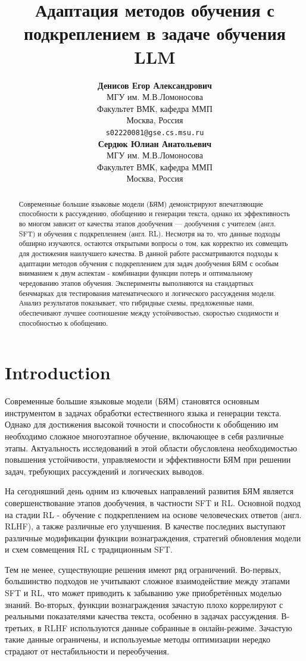 \documentclass{article}
\title{Адаптация методов обучения с подкреплением в задаче обучения LLM}
\author{\textbf{Денисов Егор Александрович} \\
	МГУ им. М.В.Ломоносова \\
	Факультет ВМК, кафедра ММП\\
	Москва, Россия \\
	\texttt{s02220081@gse.cs.msu.ru} \\
	\And
	\textbf{Сердюк Юлиан Анатольевич} \\
	МГУ им. М.В.Ломоносова \\
	Факультет ВМК, кафедра ММП \\
	Москва, Россия \\
}
\date{}
\begin{document}
\maketitle

\begin{abstract}
	Современные большие языковые модели (БЯМ) демонстрируют впечатляющие способности к рассуждению, обобщению и генерации текста, однако их эффективность во многом зависит от качества этапов дообучения — дообучения с учителем (англ. SFT) и обучения с подкреплением (англ. RL). Несмотря на то, что данные подходы обширно изучаются, остаются открытыми вопросы о том, как корректно их совмещать для достижения наилучшего качества. В данной работе рассматриваются подходы к адаптации методов обучения с подкреплением для задач дообучения БЯМ с особым вниманием к двум аспектам - комбинации функции потерь и оптимальному чередованию этапов обучения. Эксперименты выполняются на стандартных бенчмарках для тестирования математического и логического рассуждения модели. Анализ результатов показывает, что гибридные схемы, предложенные нами, обеспечивают лучшее соотношение между устойчивостью, скоростью сходимости и способностью к обобщению.
\end{abstract}



\section{Introduction}
Современные большие языковые модели (БЯМ) становятся основным инструментом в задачах обработки естественного языка и генерации текста. Однако для достижения высокой точности и способности к обобщению им необходимо сложное многоэтапное обучение, включающее в себя различные этапы. Актуальность исследований в этой области обусловлена необходимостью повышения устойчивости, управляемости и эффективности БЯМ при решении задач, требующих рассуждений и логических выводов.

На сегодняшний день одним из ключевых направлений развития БЯМ является совершенствование этапов дообучения, в частности SFT и RL. Основной подход на стадии RL - обучение с подкреплением на основе человеческих ответов (англ. RLHF), а также различные его улучшения. В качестве последних выступают различные модификации функции вознаграждения, стратегий обновления модели и схем совмещения RL с традиционным SFT.

Тем не менее, существующие решения имеют ряд ограничений. Во-первых, большинство подходов не учитывают сложное взаимодействие между этапами SFT и RL, что может приводить к забыванию уже приобретённых моделью знаний. Во-вторых, функции вознаграждения зачастую плохо коррелируют с реальными показателями качества текста, особенно в задачах рассуждения. В-третьих, в RLHF используются данные собранные в онлайн-режиме. Зачастую такие данные ограничены, и используемые методы оптимизации нередко страдают от нестабильности и переобучения.
\end{document}
